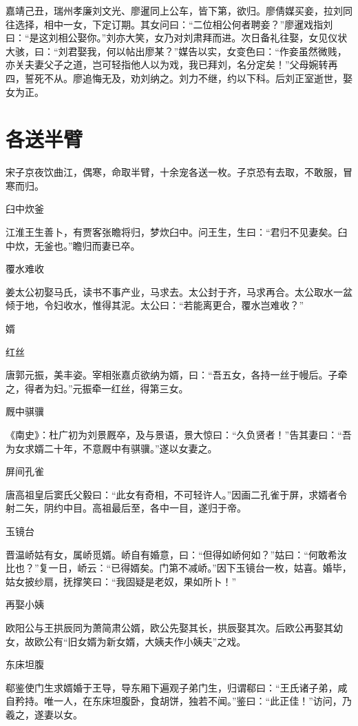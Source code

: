 \documentclass[a4paper,12pt,UTF8,twoside]{ctexbook}
\begin{document}
    嘉靖己丑，瑞州孝廉刘文光、廖暹同上公车，皆下第，欲归。廖倩媒买妾，拉刘同往选择，相中一女，下定订期。其女问曰：“二位相公何者聘妾？”廖暹戏指刘曰：“是这刘相公娶你。”刘亦大笑，女乃对刘肃拜而进。次日备礼往娶，女见仪状大骇，曰：“刘君娶我，何以帖出廖某？”媒告以实，女变色曰：“作妾虽然微贱，亦关夫妻父子之道，岂可轻指他人以为戏，我已拜刘，名分定矣！”父母婉转再四，誓死不从。廖追悔无及，劝刘纳之。刘力不继，约以下科。后刘正室逝世，娶女为正。
    
    \section{各送半臂}
    
    宋子京夜饮曲江，偶寒，命取半臂，十余宠各送一枚。子京恐有去取，不敢服，冒寒而归。
    
    臼中炊釜
    
    江淮王生善卜，有贾客张瞻将归，梦炊臼中。问王生，生曰：“君归不见妻矣。臼中炊，无釜也。”瞻归而妻已卒。
    
    覆水难收
    
    姜太公初娶马氏，读书不事产业，马求去。太公封于齐，马求再合。太公取水一盆倾于地，令妇收水，惟得其泥。太公曰：“若能离更合，覆水岂难收？”
    
    婿
    
    红丝
    
    唐郭元振，美丰姿。宰相张嘉贞欲纳为婿，曰：“吾五女，各持一丝于幔后。子牵之，得者为妇。”元振牵一红丝，得第三女。
    
    厩中骐骥
    
    《南史》：杜广初为刘景厩卒，及与景语，景大惊曰：“久负贤者！”告其妻曰：“吾为女求婿二十年，不意厩中有骐骥。”遂以女妻之。
    
    屏间孔雀
    
    唐高祖皇后窦氏父毅曰：“此女有奇相，不可轻许人。”因画二孔雀于屏，求婿者令射二矢，阴约中目。高祖最后至，各中一目，遂归于帝。
    
    玉镜台
    
    晋温峤姑有女，属峤觅婿。峤自有婚意，曰：“但得如峤何如？”姑曰：“何敢希汝比也？”复一日，峤云：“已得婿矣。门第不减峤。”因下玉镜台一枚，姑喜。婚毕，姑女披纱扇，抚撑笑曰：“我固疑是老奴，果如所卜！”
    
    再娶小姨
    
    欧阳公与王拱辰同为萧简肃公婿，欧公先娶其长，拱辰娶其次。后欧公再娶其幼女，故欧公有“旧女婿为新女婿，大姨夫作小姨夫”之戏。
    
    东床坦腹
    
    郗鉴使门生求婿婚于王导，导东厢下遍观子弟门生，归谓郗曰：“王氏诸子弟，咸自矜持。唯一人，在东床坦腹卧，食胡饼，独若不闻。”鉴曰：“此正佳！”访问，乃羲之，遂妻以女。
    
\end{document}
